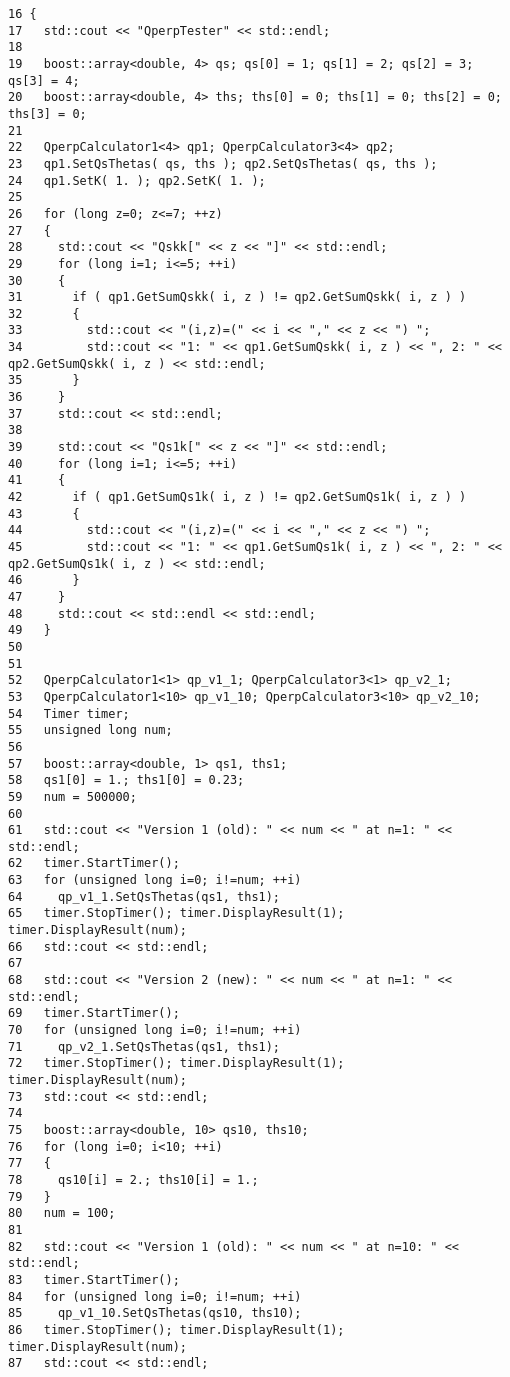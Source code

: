 \begin{Code}\begin{verbatim}16 {
17   std::cout << "QperpTester" << std::endl;
18 
19   boost::array<double, 4> qs; qs[0] = 1; qs[1] = 2; qs[2] = 3; qs[3] = 4;
20   boost::array<double, 4> ths; ths[0] = 0; ths[1] = 0; ths[2] = 0; ths[3] = 0;
21 
22   QperpCalculator1<4> qp1; QperpCalculator3<4> qp2;
23   qp1.SetQsThetas( qs, ths ); qp2.SetQsThetas( qs, ths );
24   qp1.SetK( 1. ); qp2.SetK( 1. );
25 
26   for (long z=0; z<=7; ++z)
27   {
28     std::cout << "Qskk[" << z << "]" << std::endl;
29     for (long i=1; i<=5; ++i)
30     {
31       if ( qp1.GetSumQskk( i, z ) != qp2.GetSumQskk( i, z ) )
32       {
33         std::cout << "(i,z)=(" << i << "," << z << ") ";
34         std::cout << "1: " << qp1.GetSumQskk( i, z ) << ", 2: " << qp2.GetSumQskk( i, z ) << std::endl;
35       }
36     }
37     std::cout << std::endl;
38 
39     std::cout << "Qs1k[" << z << "]" << std::endl;
40     for (long i=1; i<=5; ++i)
41     {
42       if ( qp1.GetSumQs1k( i, z ) != qp2.GetSumQs1k( i, z ) )
43       {
44         std::cout << "(i,z)=(" << i << "," << z << ") ";
45         std::cout << "1: " << qp1.GetSumQs1k( i, z ) << ", 2: " << qp2.GetSumQs1k( i, z ) << std::endl;
46       }
47     }
48     std::cout << std::endl << std::endl;
49   }
50 
51 
52   QperpCalculator1<1> qp_v1_1; QperpCalculator3<1> qp_v2_1;
53   QperpCalculator1<10> qp_v1_10; QperpCalculator3<10> qp_v2_10;
54   Timer timer;
55   unsigned long num;
56 
57   boost::array<double, 1> qs1, ths1;
58   qs1[0] = 1.; ths1[0] = 0.23;
59   num = 500000;
60 
61   std::cout << "Version 1 (old): " << num << " at n=1: " << std::endl;
62   timer.StartTimer();
63   for (unsigned long i=0; i!=num; ++i)
64     qp_v1_1.SetQsThetas(qs1, ths1);
65   timer.StopTimer(); timer.DisplayResult(1); timer.DisplayResult(num);
66   std::cout << std::endl;
67 
68   std::cout << "Version 2 (new): " << num << " at n=1: " << std::endl;
69   timer.StartTimer();
70   for (unsigned long i=0; i!=num; ++i)
71     qp_v2_1.SetQsThetas(qs1, ths1);
72   timer.StopTimer(); timer.DisplayResult(1); timer.DisplayResult(num);
73   std::cout << std::endl;
74 
75   boost::array<double, 10> qs10, ths10;
76   for (long i=0; i<10; ++i)
77   {
78     qs10[i] = 2.; ths10[i] = 1.;
79   }
80   num = 100;
81 
82   std::cout << "Version 1 (old): " << num << " at n=10: " << std::endl;
83   timer.StartTimer();
84   for (unsigned long i=0; i!=num; ++i)
85     qp_v1_10.SetQsThetas(qs10, ths10);
86   timer.StopTimer(); timer.DisplayResult(1); timer.DisplayResult(num);
87   std::cout << std::endl;

\end{verbatim}
\end{Code}
